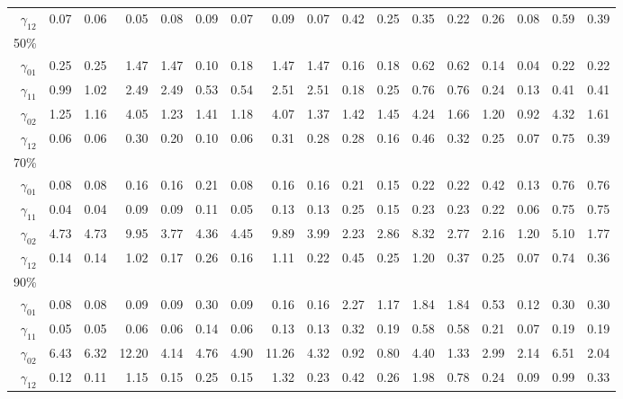 \documentclass[useAMS,usenatbib,referee]{biom}
\begin{document}
\begin{table}
\begin{tabular}{rrrrrrrrrrrrrrrrr}
$\gamma_{12}$ & 0.07 & 0.06 & 0.05 & 0.08 & 0.09 & 0.07 & 0.09 & 0.07 & 0.42 & 0.25 & 0.35 & 0.22 & 0.26 & 0.08 & 0.59 & 0.39 \\
50\% \\
$\gamma_{01}$ & 0.25 & 0.25 & 1.47 & 1.47 & 0.10 & 0.18 & 1.47 & 1.47 & 0.16 & 0.18 & 0.62 & 0.62 & 0.14 & 0.04 & 0.22 & 0.22 \\
$\gamma_{11}$  & 0.99 & 1.02 & 2.49 & 2.49 & 0.53 & 0.54 & 2.51 & 2.51 & 0.18 & 0.25 & 0.76 & 0.76 & 0.24 & 0.13 & 0.41 & 0.41 \\
$\gamma_{02}$  & 1.25 & 1.16 & 4.05 & 1.23 & 1.41 & 1.18 & 4.07 & 1.37 & 1.42 & 1.45 & 4.24 & 1.66 & 1.20 & 0.92 & 4.32 & 1.61 \\
$\gamma_{12}$  & 0.06 & 0.06 & 0.30 & 0.20 & 0.10 & 0.06 & 0.31 & 0.28 & 0.28 & 0.16 & 0.46 & 0.32 & 0.25 & 0.07 & 0.75 & 0.39 \\
70\% \\
$\gamma_{01}$  & 0.08 & 0.08 & 0.16 & 0.16 & 0.21 & 0.08 & 0.16 & 0.16 & 0.21 & 0.15 & 0.22 & 0.22 & 0.42 & 0.13 & 0.76 & 0.76 \\
$\gamma_{11}$  & 0.04 & 0.04 & 0.09 & 0.09 & 0.11 & 0.05 & 0.13 & 0.13 & 0.25 & 0.15 & 0.23 & 0.23 & 0.22 & 0.06 & 0.75 & 0.75 \\
$\gamma_{02}$  & 4.73 & 4.73 & 9.95 & 3.77 & 4.36 & 4.45 & 9.89 & 3.99 & 2.23 & 2.86 & 8.32 & 2.77 & 2.16 & 1.20 & 5.10 & 1.77 \\
$\gamma_{12}$  & 0.14 & 0.14 & 1.02 & 0.17 & 0.26 & 0.16 & 1.11 & 0.22 & 0.45 & 0.25 & 1.20 & 0.37 & 0.25 & 0.07 & 0.74 & 0.36 \\
90\% \\
$\gamma_{01}$  & 0.08 & 0.08 & 0.09 & 0.09 & 0.30 & 0.09 & 0.16 & 0.16 & 2.27 & 1.17 & 1.84 & 1.84 & 0.53 & 0.12 & 0.30 & 0.30 \\
$\gamma_{11}$  & 0.05 & 0.05 & 0.06 & 0.06 & 0.14 & 0.06 & 0.13 & 0.13 & 0.32 & 0.19 & 0.58 & 0.58 & 0.21 & 0.07 & 0.19 & 0.19 \\
$\gamma_{02}$  & 6.43 & 6.32 & 12.20 & 4.14 & 4.76 & 4.90 & 11.26 & 4.32 & 0.92 & 0.80 & 4.40 & 1.33 & 2.99 & 2.14 & 6.51 & 2.04 \\
$\gamma_{12}$  & 0.12 & 0.11 & 1.15 & 0.15 & 0.25 & 0.15 & 1.32 & 0.23 & 0.42 & 0.26 & 1.98 & 0.78 & 0.24 & 0.09 & 0.99 & 0.33 \\
\hline
  \end{tabular}

\end{table}
\end{document}
